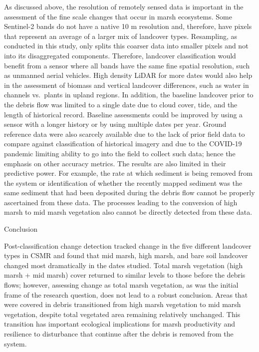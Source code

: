 \documentclass[
]{article}
\begin{document}
As discussed above, the resolution of remotely sensed data is important
in the assessment of the fine scale changes that occur in marsh
ecosystems. Some Sentinel-2 bands do not have a native 10 m resolution
and, therefore, have pixels that represent an average of a larger mix of
landcover types. Resampling, as conducted in this study, only splits
this coarser data into smaller pixels and not into its disaggregated
components. Therefore, landcover classification would benefit from a
sensor where all bands have the same fine spatial resolution, such as
unmanned aerial vehicles. High density LiDAR for more dates would also
help in the assessment of biomass and vertical landcover differences,
such as water in channels vs.~plants in upland regions. In addition, the
baseline landcover prior to the debris flow was limited to a single date
due to cloud cover, tide, and the length of historical record. Baseline
assessments could be improved by using a sensor with a longer history or
by using multiple dates per year. Ground reference data were also
scarcely available due to the lack of prior field data to compare
against classification of historical imagery and due to the COVID-19
pandemic limiting ability to go into the field to collect such data;
hence the emphasis on other accuracy metrics. The results are also
limited in their predictive power. For example, the rate at which
sediment is being removed from the system or identification of whether
the recently mapped sediment was the same sediment that had been
deposited during the debris flow cannot be properly ascertained from
these data. The processes leading to the conversion of high marsh to mid
marsh vegetation also cannot be directly detected from these data.

Conclusion

Post-classification change detection tracked change in the five
different landcover types in CSMR and found that mid marsh, high marsh,
and bare soil landcover changed most dramatically in the dates studied.
Total marsh vegetation (high marsh + mid marsh) cover returned to
similar levels to those before the debris flows; however, assessing
change as total marsh vegetation, as was the initial frame of the
research question, does not lead to a robust conclusion. Areas that were
covered in debris transitioned from high marsh vegetation to mid marsh
vegetation, despite total vegetated area remaining relatively unchanged.
This transition has important ecological implications for marsh
productivity and resilience to disturbance that continue after the
debris is removed from the system.
\end{document}
